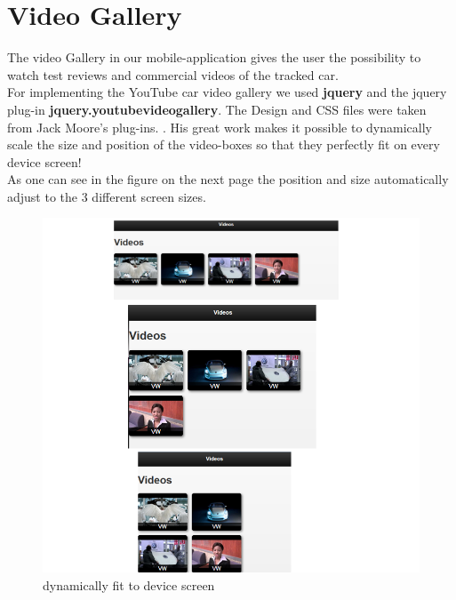 \newpage
\section{Video Gallery}
The video Gallery in our mobile-application gives the user the possibility to watch test reviews and commercial videos of the tracked car.
\\

   
For implementing the YouTube car video gallery we used \textbf{jquery} and the jquery plug-in \textbf{jquery.youtubevideogallery}. The Design and CSS files were taken from Jack Moore's plug-ins. \cite{jqueryVideo}. His great work makes it possible to dynamically scale the size and position of the video-boxes so that they perfectly fit on every device screen! 
\\

As one can see in the figure on the next page the position and size automatically adjust to the 3 different screen sizes.    

\begin{figure}[H]
\centering
\includegraphics[width=\textwidth,height=\textheight,keepaspectratio]{graphics/dynamic.png}
\caption{dynamically fit to device screen}
\end{figure}  

\newpage
